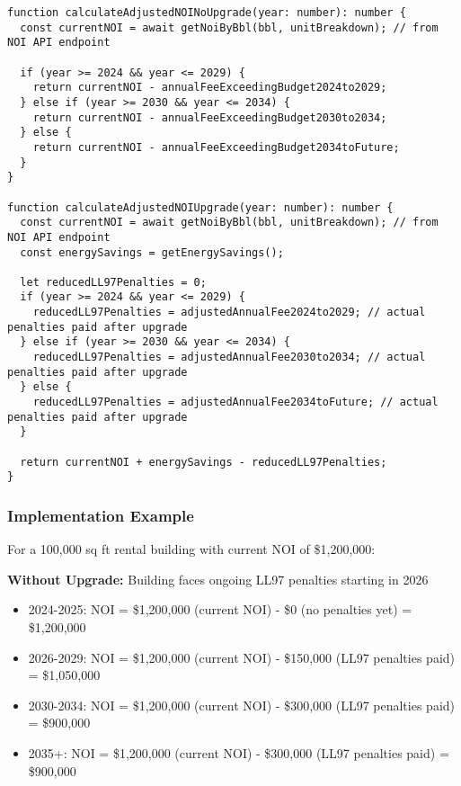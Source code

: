 \documentclass{article}
\begin{document}
\begin{lstlisting}
function calculateAdjustedNOINoUpgrade(year: number): number {
  const currentNOI = await getNoiByBbl(bbl, unitBreakdown); // from NOI API endpoint
  
  if (year >= 2024 && year <= 2029) {
    return currentNOI - annualFeeExceedingBudget2024to2029;
  } else if (year >= 2030 && year <= 2034) {
    return currentNOI - annualFeeExceedingBudget2030to2034;
  } else {
    return currentNOI - annualFeeExceedingBudget2034toFuture;
  }
}

function calculateAdjustedNOIUpgrade(year: number): number {
  const currentNOI = await getNoiByBbl(bbl, unitBreakdown); // from NOI API endpoint
  const energySavings = getEnergySavings();
  
  let reducedLL97Penalties = 0;
  if (year >= 2024 && year <= 2029) {
    reducedLL97Penalties = adjustedAnnualFee2024to2029; // actual penalties paid after upgrade
  } else if (year >= 2030 && year <= 2034) {
    reducedLL97Penalties = adjustedAnnualFee2030to2034; // actual penalties paid after upgrade  
  } else {
    reducedLL97Penalties = adjustedAnnualFee2034toFuture; // actual penalties paid after upgrade
  }
  
  return currentNOI + energySavings - reducedLL97Penalties;
}
\end{lstlisting}

\subsubsection{Implementation Example}

For a 100,000 sq ft rental building with current NOI of \$1,200,000:

\textbf{Without Upgrade:} Building faces ongoing LL97 penalties starting in 2026
\begin{itemize}
    \item 2024-2025: NOI = \$1,200,000 (current NOI) - \$0 (no penalties yet) = \$1,200,000
    \item 2026-2029: NOI = \$1,200,000 (current NOI) - \$150,000 (LL97 penalties paid) = \$1,050,000
    \item 2030-2034: NOI = \$1,200,000 (current NOI) - \$300,000 (LL97 penalties paid) = \$900,000
    \item 2035+: NOI = \$1,200,000 (current NOI) - \$300,000 (LL97 penalties paid) = \$900,000
\end{itemize}
\end{document}
